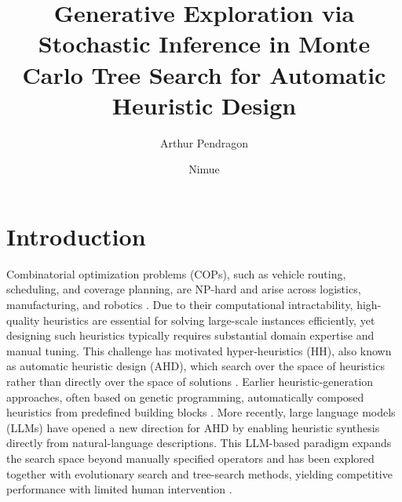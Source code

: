 \documentclass[sigconf,anonymous]{aamas}
\title[GENESIS: Stochastic Inference in MCTS for Automatic Heuristic Design]{Generative Exploration via Stochastic Inference in Monte Carlo Tree Search for Automatic Heuristic Design}
\author{Arthur Pendragon}
\affiliation{
  \institution{Camelot Castle}
  \city{Camelot}
  \country{United Kingdom}}
\author{Nimue}
\affiliation{
  \institution{The Lady's Lake}
  \city{Avalon}
  \country{United Kingdom}}
\begin{document}



\maketitle

\section{Introduction}

Combinatorial optimization problems (COPs), such as vehicle routing, scheduling, and coverage planning, are NP-hard and arise across logistics, manufacturing, and robotics \cite{garey1979computers,Laporte2009VRP,Pinedo2016Scheduling,Tan2021CPP}. Due to their computational intractability, high-quality heuristics are essential for solving large-scale instances efficiently, yet designing such heuristics typically requires substantial domain expertise and manual tuning. This challenge has motivated hyper-heuristics (HH), also known as automatic heuristic design (AHD), which search over the space of heuristics rather than directly over the space of solutions \cite{Burke2010HH,Burke2013HH}. Earlier heuristic-generation approaches, often based on genetic programming, automatically composed heuristics from predefined building blocks \cite{langdon2002foundations,Epitropakis2025HH}. More recently, large language models (LLMs) have opened a new direction for AHD by enabling heuristic synthesis directly from natural-language descriptions. This LLM-based paradigm expands the search space beyond manually specified operators and has been explored together with evolutionary search and tree-search methods, yielding competitive performance with limited human intervention \cite{ye2024reevo,fei2024eoh,zheng2025montecarlo}.
\end{document}
